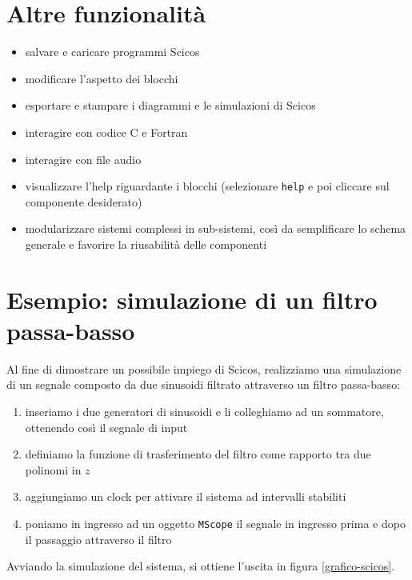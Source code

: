 \section{Altre funzionalit\`a}
\begin{itemize}
\item salvare e caricare programmi Scicos
\item modificare l'aspetto dei blocchi
\item esportare e stampare i diagrammi e le simulazioni di Scicos
\item interagire con codice C e Fortran
\item interagire con file audio
\item visualizzare l'help riguardante i blocchi (selezionare \verb+help+ e poi cliccare sul componente desiderato)
\item modularizzare sistemi complessi in sub-sistemi, cos\`i da semplificare lo schema generale e favorire la riusabilit\`a delle componenti
\end{itemize}

\section{Esempio: simulazione di un filtro passa-basso}
Al fine di dimostrare un possibile impiego di Scicos, realizziamo una simulazione di un segnale composto da due sinusoidi filtrato attraverso un filtro passa-basso:
\begin{enumerate}
\item inseriamo i due generatori di sinusoidi e li colleghiamo ad un sommatore, ottenendo cos\`i il segnale di input
\item definiamo la funzione di trasferimento del filtro come rapporto tra due polinomi in $z$
\item aggiungiamo un clock per attivare il sistema ad intervalli stabiliti
\item poniamo in ingresso ad un oggetto \verb+MScope+ il segnale in ingresso prima e dopo il passaggio attraverso il filtro 
\end{enumerate}


Avviando la simulazione del sistema, si ottiene l'uscita in figura \ref{grafico-scicos}.


